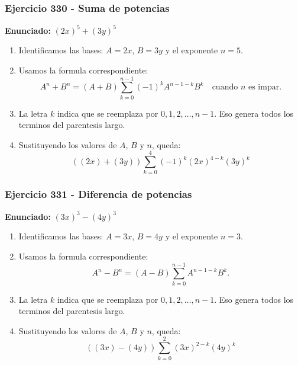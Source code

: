 \documentclass[11pt,a4paper]{article}
\begin{document}
\subsubsection*{Ejercicio 330 - Suma de potencias}
\textbf{Enunciado:} $ \left(2 x\right)^{5}+\left(3 y\right)^{5} $\par
\begin{enumerate}[leftmargin=2em]
\item Identificamos las bases: \(A=2 x\), \(B=3 y\) y el exponente \(n=5\).
\item Usamos la formula correspondiente: \[A^n+B^n=(A+B)\sum_{k=0}^{n-1}(-1)^kA^{n-1-k}B^k\quad\text{cuando }n\text{ es impar}.\]
\item La letra \(k\) indica que se reemplaza por \(0,1,2,\ldots,n-1\). Eso genera todos los terminos del parentesis largo.
\item Sustituyendo los valores de \(A\), \(B\) y \(n\), queda: \[\boxed{\left(\left(2 x\right)+\left(3 y\right)\right)\sum_{k=0}^{4}(-1)^k\left(2 x\right)^{4-k}\left(3 y\right)^k}\]
\end{enumerate}

\vspace{0.2cm}
\subsubsection*{Ejercicio 331 - Diferencia de potencias}
\textbf{Enunciado:} $ \left(3 x\right)^{3}-\left(4 y\right)^{3} $\par
\begin{enumerate}[leftmargin=2em]
\item Identificamos las bases: \(A=3 x\), \(B=4 y\) y el exponente \(n=3\).
\item Usamos la formula correspondiente: \[A^n-B^n=(A-B)\sum_{k=0}^{n-1}A^{n-1-k}B^k.\]
\item La letra \(k\) indica que se reemplaza por \(0,1,2,\ldots,n-1\). Eso genera todos los terminos del parentesis largo.
\item Sustituyendo los valores de \(A\), \(B\) y \(n\), queda: \[\boxed{\left(\left(3 x\right)-\left(4 y\right)\right)\sum_{k=0}^{2}\left(3 x\right)^{2-k}\left(4 y\right)^k}\]
\end{enumerate}

\vspace{0.2cm}
\end{document}
